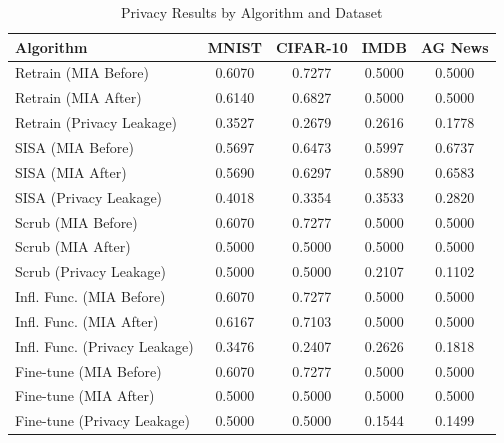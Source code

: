 \begin{table}[t]
\centering
\caption{Privacy Results by Algorithm and Dataset}
\label{tab:privacy_results}
\small
\begin{tabular}{lcccc}
\toprule
Algorithm & MNIST & CIFAR-10 & IMDB & AG News \\
\midrule
Retrain (MIA Before) & 0.6070 & 0.7277 & 0.5000 & 0.5000 \\
Retrain (MIA After) & 0.6140 & 0.6827 & 0.5000 & 0.5000 \\
Retrain (Privacy Leakage) & 0.3527 & 0.2679 & 0.2616 & 0.1778 \\
SISA (MIA Before) & 0.5697 & 0.6473 & 0.5997 & 0.6737 \\
SISA (MIA After) & 0.5690 & 0.6297 & 0.5890 & 0.6583 \\
SISA (Privacy Leakage) & 0.4018 & 0.3354 & 0.3533 & 0.2820 \\
Scrub (MIA Before) & 0.6070 & 0.7277 & 0.5000 & 0.5000 \\
Scrub (MIA After) & 0.5000 & 0.5000 & 0.5000 & 0.5000 \\
Scrub (Privacy Leakage) & 0.5000 & 0.5000 & 0.2107 & 0.1102 \\
Infl. Func. (MIA Before) & 0.6070 & 0.7277 & 0.5000 & 0.5000 \\
Infl. Func. (MIA After) & 0.6167 & 0.7103 & 0.5000 & 0.5000 \\
Infl. Func. (Privacy Leakage) & 0.3476 & 0.2407 & 0.2626 & 0.1818 \\
Fine-tune (MIA Before) & 0.6070 & 0.7277 & 0.5000 & 0.5000 \\
Fine-tune (MIA After) & 0.5000 & 0.5000 & 0.5000 & 0.5000 \\
Fine-tune (Privacy Leakage) & 0.5000 & 0.5000 & 0.1544 & 0.1499 \\
\bottomrule
\end{tabular}
\end{table}
